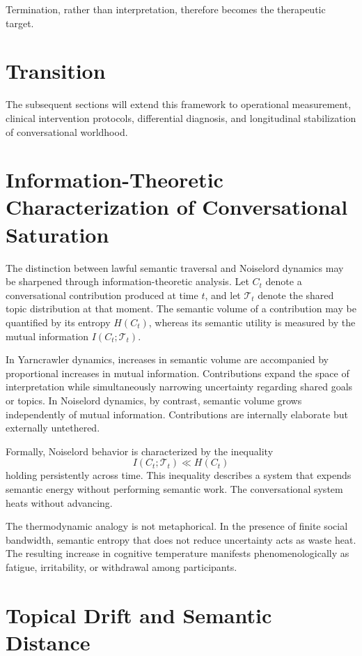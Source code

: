 \documentclass[12pt]{article}
\theoremstyle{remark}
\begin{document}
Termination, rather than interpretation, therefore becomes the therapeutic target.

\section{Transition}

The subsequent sections will extend this framework to operational measurement, clinical intervention protocols, differential diagnosis, and longitudinal stabilization of conversational worldhood.

\section{Information-Theoretic Characterization of Conversational Saturation}

The distinction between lawful semantic traversal and Noiselord dynamics may be sharpened through information-theoretic analysis. Let $C_t$ denote a conversational contribution produced at time $t$, and let $\mathcal{T}_t$ denote the shared topic distribution at that moment. The semantic volume of a contribution may be quantified by its entropy $H(C_t)$, whereas its semantic utility is measured by the mutual information $I(C_t;\mathcal{T}_t)$.

In Yarncrawler dynamics, increases in semantic volume are accompanied by proportional increases in mutual information. Contributions expand the space of interpretation while simultaneously narrowing uncertainty regarding shared goals or topics. In Noiselord dynamics, by contrast, semantic volume grows independently of mutual information. Contributions are internally elaborate but externally untethered.

Formally, Noiselord behavior is characterized by the inequality
\[
I(C_t;\mathcal{T}_t) \ll H(C_t)
\]
holding persistently across time. This inequality describes a system that expends semantic energy without performing semantic work. The conversational system heats without advancing.

The thermodynamic analogy is not metaphorical. In the presence of finite social bandwidth, semantic entropy that does not reduce uncertainty acts as waste heat. The resulting increase in cognitive temperature manifests phenomenologically as fatigue, irritability, or withdrawal among participants.

\section{Topical Drift and Semantic Distance}
\end{document}
